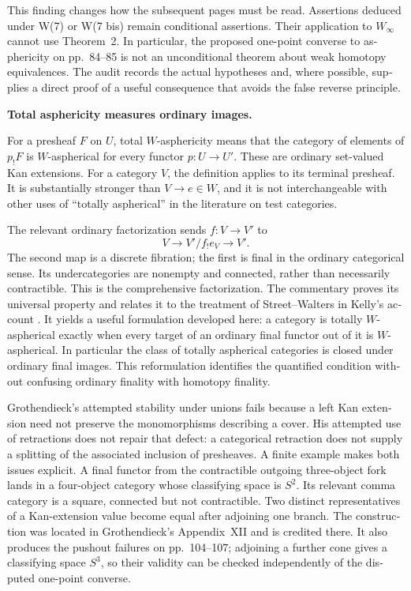 \begin{otherlanguage}{english}
This finding changes how the subsequent pages must be read. Assertions deduced under W(7) or W(7 bis) remain conditional assertions. Their application to $W_\infty$ cannot use Theorem~2. In particular, the proposed one-point converse to asphericity on pp.~84--85 is not an unconditional theorem about weak homotopy equivalences. The audit records the actual hypotheses and, where possible, supplies a direct proof of a useful consequence that avoids the false reverse principle.

\medskip
{}
\noindent\textbf{Total asphericity measures ordinary images.}

For a presheaf $F$ on $U$, total $W$-asphericity means that the category of elements of $p_!F$ is $W$-aspherical for every functor $p:U\to U'$. These are ordinary set-valued Kan extensions. For a category $V$, the definition applies to its terminal presheaf. It is substantially stronger than $V\to e\in W$, and it is not interchangeable with other uses of ``totally aspherical'' in the literature on test categories.

The relevant ordinary factorization sends $f:V\to V'$ to
\[
 V\longrightarrow V'/f_!e_V\longrightarrow V'.
\]
The second map is a discrete fibration; the first is final in the ordinary categorical sense. Its undercategories are nonempty and connected, rather than necessarily contractible. This is the comprehensive factorization. The commentary proves its universal property and relates it to the treatment of Street--Walters in Kelly's account \citep[\S4.7]{Kelly1982}. It yields a useful formulation developed here: a category is totally $W$-aspherical exactly when every target of an ordinary final functor out of it is $W$-aspherical. In particular the class of totally aspherical categories is closed under ordinary final images. This reformulation identifies the quantified condition without confusing ordinary finality with homotopy finality.

Grothendieck's attempted stability under unions fails because a left Kan extension need not preserve the monomorphisms describing a cover. His attempted use of retractions does not repair that defect: a categorical retraction does not supply a splitting of the associated inclusion of presheaves. A finite example makes both issues explicit. A final functor from the contractible outgoing three-object fork lands in a four-object category whose classifying space is $S^2$. Its relevant comma category is a square, connected but not contractible. Two distinct representatives of a Kan-extension value become equal after adjoining one branch. The construction was located in Grothendieck's Appendix~XII and is credited there. It also produces the pushout failures on pp.~104--107; adjoining a further cone gives a classifying space $S^3$, so their validity can be checked independently of the disputed one-point converse.


\end{otherlanguage}
